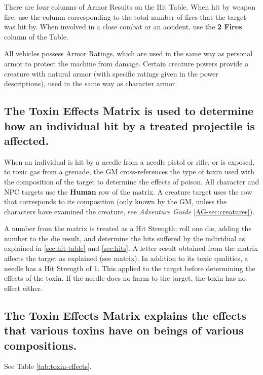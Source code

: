 There are four columns of Armor Results on the Hit Table. When hit by
weapon fire, use the column corresponding to the total number of fires
that the target was hit by. When involved in a close combat or an
accident, use the \textbf{2 Fires} column of the Table.

All vehicles possess Armor Ratings, which are used in the same way as
personal armor to protect the machine from damage.  Certain creature
powers provide a creature with natural armor (with specific ratings
given in the power descriptions), used in the same way as character
armor.

\subsection[Toxin Effects]{The Toxin Effects Matrix is used to
  determine how an 
  individual hit by a treated projectile is affected.}
\label{sec:toxin-effects-matrix}

When an individual is hit by a needle from a needle pistol or rifle,
or is exposed, to toxic gas from a grenade, the GM cross-references
the type of toxin used with the composition of the target to determine
the effects of poison. All character and NPC targets use the
\textbf{Human} row of the matrix. A creature target uses the row that
corresponds to its composition (only known by the GM, unless the
characters have examined the creature, see \emph{Adventure Guide} \ref{AG-sec:creatures}).

A number from the matrix is treated as a Hit Strength; roll one die,
adding the number to the die result, and determine the hits suffered
by the individual as explained in \ref{sec:hit-table} and
\ref{sec:hits}. A letter result obtained from the matrix affects the
target as explained (see matrix). In addition to its toxic qualities,
a needle has a Hit Strength of 1. This applied to the target before
determining the effects of the toxin. If the needle does no harm to
the target, the toxin has no effect either.

\subsection[Toxin Effects Matrix]{The Toxin Effects Matrix explains
  the effects that various 
  toxins have on beings of various compositions.}
\label{sec:toxin-effects-matrix-1}

See Table \vref{tab:toxin-effects}.

